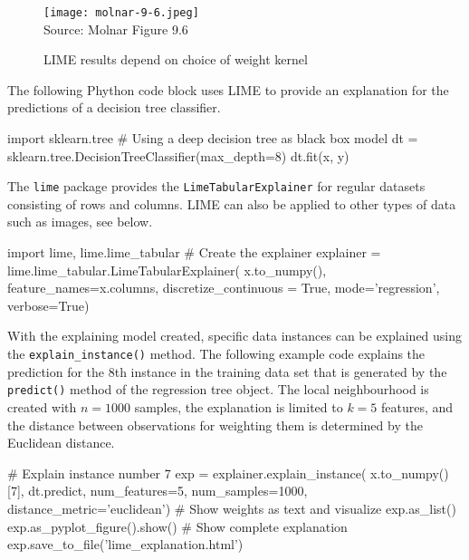 \begin{figure}
\centering

\texttt{[image: molnar-9-6.jpeg]} \\

\scriptsize Source: Molnar Figure 9.6
\caption{LIME results depend on choice of weight kernel}
\label{fig:molnar96}
\end{figure}

The following Phython code block uses LIME to provide an explanation for the predictions of a decision tree classifier. 

\begin{samepage}
\begin{pythoncode}
import sklearn.tree
# Using a deep decision tree as black box model
dt = sklearn.tree.DecisionTreeClassifier(max_depth=8)
dt.fit(x, y)
\end{pythoncode}
\end{samepage}

The \texttt{lime} package provides the \texttt{LimeTabularExplainer} for regular datasets consisting of rows and columns. LIME can also be applied to other types of data such as images, see below.

\begin{samepage}
\begin{pythoncode}
import lime, lime.lime_tabular
# Create the explainer
explainer = lime.lime_tabular.LimeTabularExplainer(
    x.to_numpy(), 
    feature_names=x.columns, 
    discretize_continuous = True, 
    mode='regression', 
    verbose=True)
\end{pythoncode}
\end{samepage}

With the explaining model created, specific data instances can be explained using the \texttt{explain\_instance()} method. The following example code explains the prediction for the 8th instance in the training data set that is generated by the \texttt{predict()} method of the regression tree object. The local neighbourhood is created with $n=1000$ samples, the explanation is limited to $k=5$ features, and the distance between observations for weighting them is determined by the Euclidean distance.

\begin{samepage}
\begin{pythoncode}
# Explain instance number 7
exp = explainer.explain_instance( 
    x.to_numpy()[7], 
    dt.predict, 
    num_features=5, 
    num_samples=1000, 
    distance_metric='euclidean')
# Show weights as text and visualize
exp.as_list()
exp.as_pyplot_figure().show()
# Show complete explanation
exp.save_to_file('lime_explanation.html')
\end{pythoncode}
\end{samepage}

